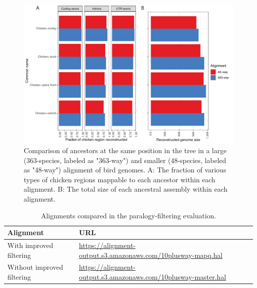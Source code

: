 \documentclass{article}
\begin{document}
\begin{figure}
    \centering
    \includegraphics[width=\textwidth]{363wayvs48wayancestorscombined.pdf}
    \caption{Comparison of ancestors at the same position in the tree in a large (363-species, labeled as "363-way") and smaller (48-species, labeled as "48-way") alignment of bird genomes. A: The fraction of various types of chicken regions mappable to each ancestor within each alignment. B: The total size of each ancestral assembly within each alignment.}
    \label{fig:birdAncestorComparison} 
\end{figure}



\begin{table}
\begin{center}
\begin{tabular}{l|l}
Alignment & URL \\
\midrule
With improved filtering & \url{https://alignment-output.s3.amazonaws.com/10plusway-mapq.hal} \\
Without improved filtering & \url{https://alignment-output.s3.amazonaws.com/10plusway-master.hal} \\
\end{tabular}
\caption{Alignments compared in the paralogy-filtering evaluation.}\label{tab:mapqHals}
\end{center}
\end{table}
\end{document}
